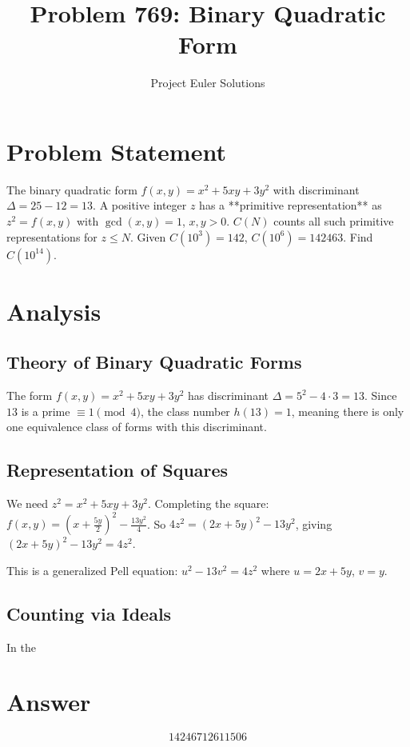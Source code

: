 \documentclass[11pt]{article}
\title{Problem 769: Binary Quadratic Form}
\author{Project Euler Solutions}
\date{}
\begin{document}
\maketitle
\section{Problem Statement}
The binary quadratic form $f(x,y) = x^2 + 5xy + 3y^2$ with discriminant $\Delta = 25-12 = 13$. A positive integer $z$ has a **primitive representation** as $z^2 = f(x,y)$ with $\gcd(x,y)=1$, $x,y > 0$. $C(N)$ counts all such primitive representations for $z \le N$. Given $C(10^3) = 142$, $C(10^6) = 142463$. Find $C(10^{14})$.
\section{Analysis}
\subsection*{Theory of Binary Quadratic Forms}

The form $f(x,y) = x^2 + 5xy + 3y^2$ has discriminant $\Delta = 5^2 - 4 \cdot 3 = 13$. Since $13$ is a prime $\equiv 1 \pmod{4}$, the class number $h(13) = 1$, meaning there is only one equivalence class of forms with this discriminant.

\subsection*{Representation of Squares}

We need $z^2 = x^2 + 5xy + 3y^2$. Completing the square: $f(x,y) = (x + \frac{5y}{2})^2 - \frac{13y^2}{4}$. So $4z^2 = (2x+5y)^2 - 13y^2$, giving $(2x+5y)^2 - 13y^2 = 4z^2$.

This is a generalized Pell equation: $u^2 - 13v^2 = 4z^2$ where $u = 2x+5y$, $v = y$.

\subsection*{Counting via Ideals}

In the
\section{Answer}

\[
\boxed{14246712611506}
\]
\end{document}
